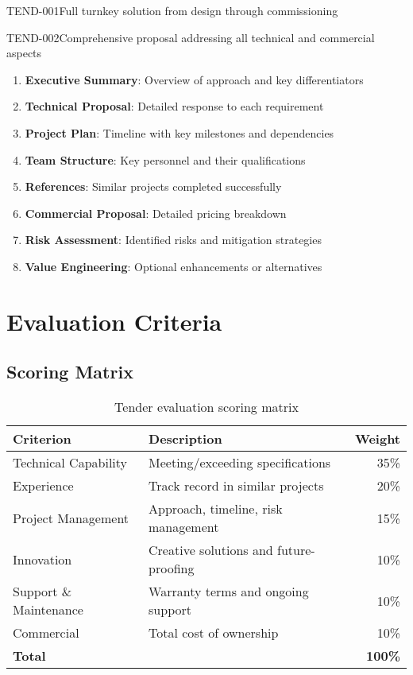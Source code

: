 \begin{requirement}{TEND-001}{Full turnkey solution from design through commissioning}
\begin{requirement}{TEND-002}{Comprehensive proposal addressing all technical and commercial aspects}
\begin{enumerate}
    \item \textbf{Executive Summary}: Overview of approach and key differentiators
    \item \textbf{Technical Proposal}: Detailed response to each requirement
    \item \textbf{Project Plan}: Timeline with key milestones and dependencies
    \item \textbf{Team Structure}: Key personnel and their qualifications
    \item \textbf{References}: Similar projects completed successfully
    \item \textbf{Commercial Proposal}: Detailed pricing breakdown
    \item \textbf{Risk Assessment}: Identified risks and mitigation strategies
    \item \textbf{Value Engineering}: Optional enhancements or alternatives
\end{enumerate}

\section{Evaluation Criteria}

\subsection{Scoring Matrix}

\begin{table}[H]
\centering
\begin{tabularx}{\textwidth}{@{}lXr@{}}
\toprule
\textbf{Criterion} & \textbf{Description} & \textbf{Weight} \\
\midrule
Technical Capability & Meeting/exceeding specifications & 35\% \\
Experience & Track record in similar projects & 20\% \\
Project Management & Approach, timeline, risk management & 15\% \\
Innovation & Creative solutions and future-proofing & 10\% \\
Support \& Maintenance & Warranty terms and ongoing support & 10\% \\
Commercial & Total cost of ownership & 10\% \\
\midrule
\textbf{Total} & & \textbf{100\%} \\
\bottomrule
\end{tabularx}
\caption{Tender evaluation scoring matrix}
\end{table}


\end{requirement}
\end{requirement}
